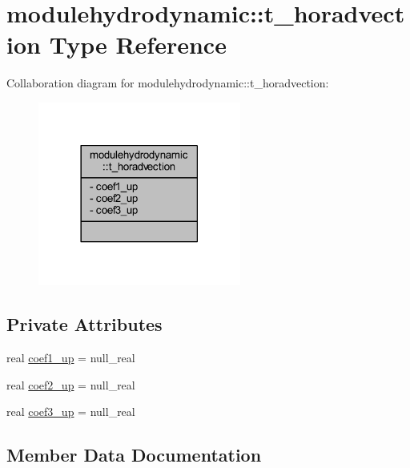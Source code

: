 \hypertarget{structmodulehydrodynamic_1_1t__horadvection}{}\section{modulehydrodynamic\+:\+:t\+\_\+horadvection Type Reference}
\label{structmodulehydrodynamic_1_1t__horadvection}


Collaboration diagram for modulehydrodynamic\+:\+:t\+\_\+horadvection\+:\nopagebreak
\begin{figure}[H]
\begin{center}
\leavevmode
\includegraphics[width=189pt]{structmodulehydrodynamic_1_1t__horadvection__coll__graph}
\end{center}
\end{figure}
\subsection*{Private Attributes}
\begin{DoxyCompactItemize}
\item 
real \mbox{\hyperlink{structmodulehydrodynamic_1_1t__horadvection_ab71a37b4bea1b4d7f07480e5c6769ddd}{coef1\+\_\+up}} = null\+\_\+real
\item 
real \mbox{\hyperlink{structmodulehydrodynamic_1_1t__horadvection_a02be5df04bbbe4169f68069b6a309b8f}{coef2\+\_\+up}} = null\+\_\+real
\item 
real \mbox{\hyperlink{structmodulehydrodynamic_1_1t__horadvection_a8ee3b028ef5af353373b559d127b0326}{coef3\+\_\+up}} = null\+\_\+real
\end{DoxyCompactItemize}


\subsection{Member Data Documentation}
\mbox{\label{structmodulehydrodynamic_1_1t__horadvection_ab71a37b4bea1b4d7f07480e5c6769ddd}} 
